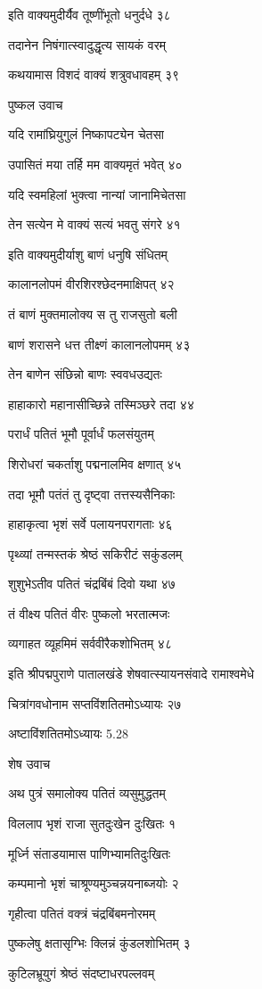 इति वाक्यमुदीर्यैव तूष्णींभूतो धनुर्दधे ३८

तदानेन निषंगात्स्वादुद्धृत्य सायकं वरम्

कथयामास विशदं वाक्यं शत्रुवधावहम् ३९

पुष्कल उवाच

यदि रामांघ्रियुगुलं निष्कापट्येन चेतसा

उपासितं मया तर्हि मम वाक्यमृतं भवेत् ४०

यदि स्वमहिलां भुक्त्वा नान्यां जानामिचेतसा

तेन सत्येन मे वाक्यं सत्यं भवतु संगरे ४१

इति वाक्यमुदीर्याशु बाणं धनुषि संधितम्

कालानलोपमं वीरशिरश्छेदनमाक्षिपत् ४२

तं बाणं मुक्तमालोक्य स तु राजसुतो बली

बाणं शरासने धत्त तीक्ष्णं कालानलोपमम् ४३

तेन बाणेन संछिन्नो बाणः स्ववधउद्यतः

हाहाकारो महानासीच्छिन्ने तस्मिञ्छरे तदा ४४

परार्धं पतितं भूमौ पूर्वार्धं फलसंयुतम्

शिरोधरां चकर्ताशु पद्मनालमिव क्षणात् ४५

तदा भूमौ पतंतं तु दृष्ट्वा तत्तस्यसैनिकाः

हाहाकृत्वा भृशं सर्वे पलायनपरागताः ४६

पृथ्व्यां तन्मस्तकं श्रेष्ठं सकिरीटं सकुंडलम्

शुशुभेऽतीव पतितं चंद्रबिंबं दिवो यथा ४७

तं वीक्ष्य पतितं वीरः पुष्कलो भरतात्मजः

व्यगाहत व्यूहमिमं सर्ववीरैकशोभितम् ४८

इति श्रीपद्मपुराणे पातालखंडे शेषवात्स्यायनसंवादे रामाश्वमेधे

चित्रांगवधोनाम सप्तविंशतितमोऽध्यायः २७

अष्टाविंशतितमोऽध्यायः 5.28

शेष उवाच

अथ पुत्रं समालोक्य पतितं व्यसुमुद्धतम्

विललाप भृशं राजा सुतदुःखेन दुःखितः १

मूर्ध्नि संताडयामास पाणिभ्यामतिदुःखितः

कम्पमानो भृशं चाश्रूण्यमुञ्चन्नयनाब्जयोः २

गृहीत्वा पतितं वक्त्रं चंद्रबिंबमनोरमम्

पुष्कलेषु क्षतासृग्भिः क्लिन्नं कुंडलशोभितम् ३

कुटिलभ्रूयुगं श्रेष्ठं संदष्टाधरपल्लवम्

